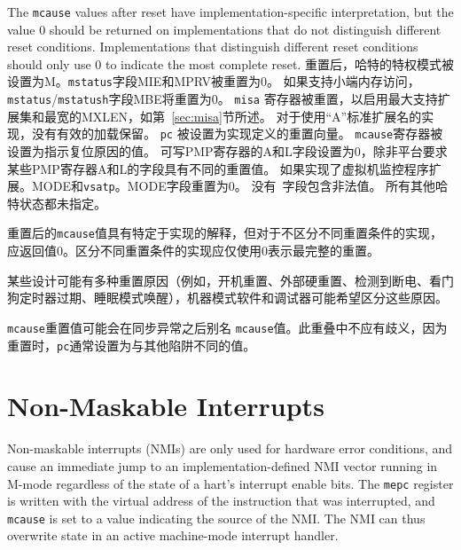 {The {\tt mcause} values after reset have implementation-specific
interpretation, but the value 0 should be returned on implementations
that do not distinguish different reset conditions. Implementations
that distinguish different reset conditions should only use 0 to
indicate the most complete reset.
\fi
重置后，哈特的特权模式被设置为M。{\tt mstatus}字段MIE和MPRV被重置为0。
如果支持小端内存访问，{\tt mstatus}/{\tt mstatush}字段MBE将重置为0。
{\tt misa} 寄存器被重置，以启用最大支持扩展集和最宽的MXLEN，如第~\ref{sec:misa}节所述。
对于使用“A”标准扩展名的实现，没有有效的加载保留。
{\tt pc} 被设置为实现定义的重置向量。 {\tt mcause}寄存器被设置为指示复位原因的值。
可写PMP寄存器的A和L字段设置为0，除非平台要求某些PMP寄存器A和L的字段具有不同的重置值。
如果实现了虚拟机监控程序扩展。MODE和{\tt vsatp}。MODE字段重置为0。
没有\warl\ 字段包含非法值。
所有其他哈特状态都未指定。

重置后的{\tt mcause}值具有特定于实现的解释，但对于不区分不同重置条件的实现，应返回值0。区分不同重置条件的实现应仅使用0表示最完整的重置。

\iffalse
\begin{commentary}
Some designs may have multiple causes of reset (e.g., power-on reset,
external hard reset, brownout detected, watchdog timer elapse,
sleep-mode wakeup), which machine-mode software and debuggers may wish
to distinguish.

{\tt mcause} reset values may alias {\tt mcause} values following synchronous
exceptions.  There should be no ambiguity in this overlap, since on reset the
{\tt pc} is typically set to a different value than on other traps.
\end{commentary}
\fi
\begin{commentary}
某些设计可能有多种重置原因（例如，开机重置、外部硬重置、检测到断电、看门狗定时器过期、睡眠模式唤醒），机器模式软件和调试器可能希望区分这些原因。

{\tt mcause}重置值可能会在同步异常之后别名 {\tt mcause}值。此重叠中不应有歧义，因为重置时，{\tt pc}通常设置为与其他陷阱不同的值。
\end{commentary}

\section{Non-Maskable Interrupts}
\label{sec:nmi}

\iffalse
Non-maskable interrupts (NMIs) are only used for hardware error
conditions, and cause an immediate jump to an implementation-defined
NMI vector running in M-mode regardless of the state of a hart's
interrupt enable bits.  The {\tt mepc} register is written with the
virtual address of the instruction that was interrupted,
and {\tt mcause} is set to a value indicating the source of the
NMI.  The NMI can thus overwrite state in an active machine-mode
interrupt handler.

}
